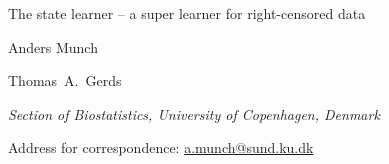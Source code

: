 \documentclass[a4paper]{article}
\begin{document}
\Large The state learner -- a super learner for right-censored data

\normalsize

\vspace{2cm}

Anders Munch

\vspace{.5cm}

Thomas~A.~Gerds

\vspace{.5cm}

\textit{Section of Biostatistics, University of Copenhagen, Denmark}

\vspace{2cm}

Address for correspondence: \href{mailto:a.munch@sund.ku.dk}{a.munch@sund.ku.dk}





\end{document}
